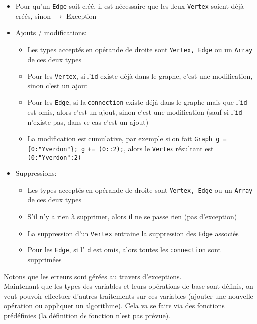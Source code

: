 \documentclass[french]{article}
\begin{document}
\begin{itemize}
\begin{itemize}
			\item Pour qu'un \texttt{Edge} soit créé, il est nécessaire que les deux \texttt{Vertex} soient déjà créés, sinon $\rightarrow$ Exception
			\item Ajouts / modifications:
			\begin{itemize}
				\item Les types acceptés en opérande de droite sont \texttt{Vertex, Edge} ou un \texttt{Array} de ces deux types
				\item Pour les \texttt{Vertex}, si l'\texttt{id} existe déjà dans le graphe, c'est une modification, sinon c'est un ajout
				\item Pour les \texttt{Edge}, si la \texttt{connection} existe déjà dans le graphe mais que l'\texttt{id} est omis, alors c'est un ajout, sinon c'est une modification (sauf si l'\texttt{id} n'existe pas, dans ce cas c'est un ajout)
				\item La modification est cumulative, par exemple si on fait \texttt{Graph g = \{0:"Yverdon"\}; g += (0::2);}, alors le \texttt{Vertex} résultant est \texttt{(0:"Yverdon":2)}
			\end{itemize}
			\item Suppressions:
			\begin{itemize}
				\item Les types acceptés en opérande de droite sont \texttt{Vertex, Edge} ou un \texttt{Array} de ces deux types
				\item S'il n'y a rien à supprimer, alors il ne se passe rien (pas d'exception)
				\item La suppression d'un \texttt{Vertex} entraine la suppression des \texttt{Edge} associés
				\item Pour les \texttt{Edge}, si l'\texttt{id} est omis, alors toutes les \texttt{connection} sont supprimées
			\end{itemize}
		\end{itemize}
	\end{itemize}
	
	Notons que les erreurs sont gérées au travers d'exceptions.\\
	
	Maintenant que les types des variables et leurs opérations de base sont définis, on veut pouvoir effectuer d'autres traitements sur ces variables (ajouter une nouvelle opération ou appliquer un algorithme). Cela va se faire via des fonctions prédéfinies (la définition de fonction n'est pas prévue).\\
	
\end{document}

